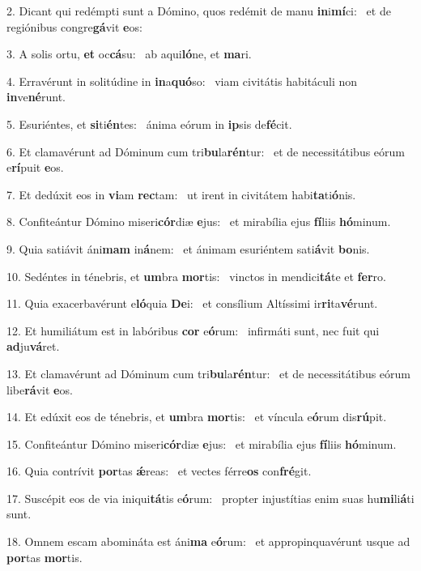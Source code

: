 2. Dicant qui redémpti sunt a Dómino, quos redémit de manu \textbf{in}i\textbf{mí}ci: \ast\  et de regiónibus congre\textbf{gá}vit \textbf{e}os:\

3. A solis ortu, \textbf{et} oc\textbf{cá}su: \ast\  ab aqui\textbf{ló}ne, et \textbf{ma}ri.\

4. Erravérunt in solitúdine in \textbf{in}a\textbf{quó}so: \ast\  viam civitátis habitáculi non \textbf{in}ve\textbf{né}runt.\

5. Esuriéntes, et \textbf{si}ti\textbf{én}tes: \ast\  ánima eórum in \textbf{ip}sis de\textbf{fé}cit.\

6. Et clamavérunt ad Dóminum cum tri\textbf{bu}la\textbf{rén}tur: \ast\  et de necessitátibus eórum e\textbf{rí}puit \textbf{e}os.\

7. Et dedúxit eos in \textbf{vi}am \textbf{rec}tam: \ast\  ut irent in civitátem habi\textbf{ta}ti\textbf{ó}nis.\

8. Confiteántur Dómino miseri\textbf{cór}diæ \textbf{e}jus: \ast\  et mirabília ejus \textbf{fí}liis \textbf{hó}minum.\

9. Quia satiávit áni\textbf{mam} in\textbf{á}nem: \ast\  et ánimam esuriéntem sati\textbf{á}vit \textbf{bo}nis.\

10. Sedéntes in ténebris, et \textbf{um}bra \textbf{mor}tis: \ast\  vinctos in mendici\textbf{tá}te et \textbf{fer}ro.\

11. Quia exacerbavérunt e\textbf{ló}quia \textbf{De}i: \ast\  et consílium Altíssimi ir\textbf{ri}ta\textbf{vé}runt.\

12. Et humiliátum est in labóribus \textbf{cor} e\textbf{ó}rum: \ast\  infirmáti sunt, nec fuit qui \textbf{ad}ju\textbf{vá}ret.\

13. Et clamavérunt ad Dóminum cum tri\textbf{bu}la\textbf{rén}tur: \ast\  et de necessitátibus eórum libe\textbf{rá}vit \textbf{e}os.\

14. Et edúxit eos de ténebris, et \textbf{um}bra \textbf{mor}tis: \ast\  et víncula e\textbf{ó}rum dis\textbf{rú}pit.\

15. Confiteántur Dómino miseri\textbf{cór}diæ \textbf{e}jus: \ast\  et mirabília ejus \textbf{fí}liis \textbf{hó}minum.\

16. Quia contrívit \textbf{por}tas \textbf{ǽ}reas: \ast\  et vectes férre\textbf{os} con\textbf{fré}git.\

17. Suscépit eos de via iniqui\textbf{tá}tis e\textbf{ó}rum: \ast\  propter injustítias enim suas hu\textbf{mi}li\textbf{á}ti sunt.\

18. Omnem escam abomináta est áni\textbf{ma} e\textbf{ó}rum: \ast\  et appropinquavérunt usque ad \textbf{por}tas \textbf{mor}tis.\

